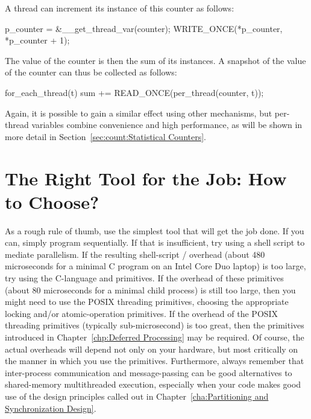 A thread can increment its instance of this counter as follows:

\begin{VerbatimU}
p_counter = &__get_thread_var(counter);
WRITE_ONCE(*p_counter, *p_counter + 1);
\end{VerbatimU}

The value of the counter is then the sum of its instances.
A snapshot of the value of the counter can thus be collected
as follows:

\begin{VerbatimU}
for_each_thread(t)
  sum += READ_ONCE(per_thread(counter, t));
\end{VerbatimU}

Again, it is possible to gain a similar effect using other mechanisms,
but per-thread variables combine convenience and high performance,
as will be shown in more detail in
Section~\ref{sec:count:Statistical Counters}.

\section{The Right Tool for the Job: How to Choose?}
\label{sec:toolsoftrade:The Right Tool for the Job: How to Choose?}

As a rough rule of thumb, use the simplest tool that will get the job done.
If you can, simply program sequentially.
If that is insufficient, try using a shell script to mediate parallelism.
If the resulting shell-script / overhead
(about 480 microseconds for a minimal C program on an Intel Core Duo
laptop) is too
large, try using the C-language  and  primitives.
If the overhead of these primitives (about 80 microseconds for a minimal
child process) is still too large, then you
might need to use the POSIX threading primitives, choosing the appropriate
locking and/or atomic-operation primitives.
If the overhead of the POSIX threading primitives (typically sub-microsecond)
is too great, then the primitives introduced in
Chapter~\ref{chp:Deferred Processing} may be required.
Of course, the actual overheads will depend not only on your hardware,
but most critically on the manner in which you use the primitives.
Furthermore, always remember that inter-process communication and
message-passing can be good alternatives to shared-memory multithreaded
execution, especially when your code makes good use of the design
principles called out in
Chapter~\ref{cha:Partitioning and Synchronization Design}.

